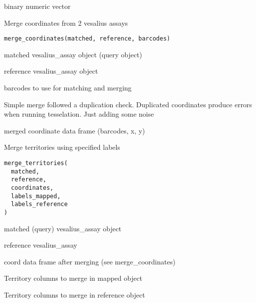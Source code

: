\documentclass[a4paper]{book}
\begin{document}
%
\begin{Value}
binary numeric vector
\end{Value}
%
\begin{Description}
Merge coordinates from 2 vesalius assays
\end{Description}
%
\begin{Usage}
\begin{verbatim}
merge_coordinates(matched, reference, barcodes)
\end{verbatim}
\end{Usage}
%
\begin{Arguments}
\begin{ldescription}
\item[\code{matched}] matched vesalius\_assay object (query object)

\item[\code{reference}] reference vesalius\_assay object

\item[\code{barcodes}] barcodes to use for matching and merging
\end{ldescription}
\end{Arguments}
%
\begin{Details}
Simple merge followed a duplication check. Duplicated
coordinates produce errors when running tesselation. Just
adding some noise
\end{Details}
%
\begin{Value}
merged coordinate data frame (barcodes, x, y)
\end{Value}
%
\begin{Description}
Merge territories using specified labels
\end{Description}
%
\begin{Usage}
\begin{verbatim}
merge_territories(
  matched,
  reference,
  coordinates,
  labels_mapped,
  labels_reference
)
\end{verbatim}
\end{Usage}
%
\begin{Arguments}
\begin{ldescription}
\item[\code{matched}] matched (query) vesalius\_assay object

\item[\code{reference}] reference vesalius\_assay

\item[\code{coordinates}] coord data frame after merging (see merge\_coordinates)

\item[\code{labels\_mapped}] Territory columns to merge in mapped object

\item[\code{labels\_reference}] Territory columns to merge in reference object
\end{ldescription}
\end{Arguments}
\end{document}
